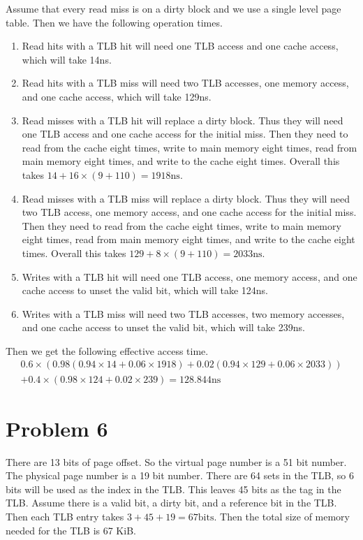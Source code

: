 \documentclass[12pt]{article}
\begin{document}
Assume that every read miss is on a dirty block and we use a single level page table. Then we have the following operation times.
\begin{enumerate}
        \item Read hits with a TLB hit will need one TLB access and one cache access, which will take 14ns.
        \item Read hits with a TLB miss will need two TLB accesses, one memory access, and one cache access, which will take 129ns.
        \item Read misses with a TLB hit will replace a dirty block. Thus they will need one TLB access and one cache access for the initial miss.
        Then they need to read from the cache eight times, write to main memory eight times, read from main memory eight times,
        and write to the cache eight times. Overall this takes \(14+16\times(9+110) = 1918\text{ns}\).
        \item Read misses with a TLB miss will replace a dirty block. Thus they will need two TLB access, one memory access, and one cache
        access for the initial miss. Then they need to read from the cache eight times, write to main memory eight times, read from main memory eight times,
        and write to the cache eight times. Overall this takes \(129+8\times(9+110) = 2033\text{ns}\).
        \item Writes with a TLB hit will need one TLB access, one memory access, and one cache access to unset the valid bit, which will take 124ns.
        \item Writes with a TLB miss will need two TLB accesses, two memory accesses, and one cache access to unset the valid bit, which will take 239ns.
\end{enumerate}
Then we get the following effective access time.
\begin{multline*}
        0.6\times(0.98(0.94\times 14+0.06\times 1918)+0.02(0.94\times 129+0.06\times 2033))\\
        + 0.4\times(0.98\times 124+0.02\times 239)=128.844\text{ns}
\end{multline*}

\section*{Problem 6}

There are 13 bits of page offset. So the virtual page number is a 51 bit number. The physical page number is a 19 bit number. There are 64 sets
in the TLB, so 6 bits will be used as the index in the TLB. This leaves 45 bits as the tag in the TLB. Assume there is a valid bit, a dirty bit, and a
reference bit in the TLB. Then each TLB entry takes \(3+45+19=67\text{bits}\). Then the total size of memory needed for the TLB is 67 KiB.
\end{document}
